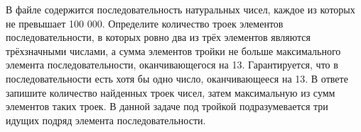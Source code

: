 \documentclass[14pt,a4paper]{article}
\begin{document}
В файле содержится последовательность натуральных чисел, каждое из
которых не превышает 100 000. Определите количество троек элементов
последовательности, в которых ровно два из трёх элементов являются
трёхзначными числами, а сумма элементов тройки не больше
максимального элемента последовательности, оканчивающегося на 13.
Гарантируется, что в последовательности есть хотя бы одно число,
оканчивающееся на 13. В ответе запишите количество найденных троек
чисел, затем максимальную из сумм элементов таких троек. В данной
задаче под тройкой подразумевается три идущих подряд элемента
последовательности.
\end{document}
